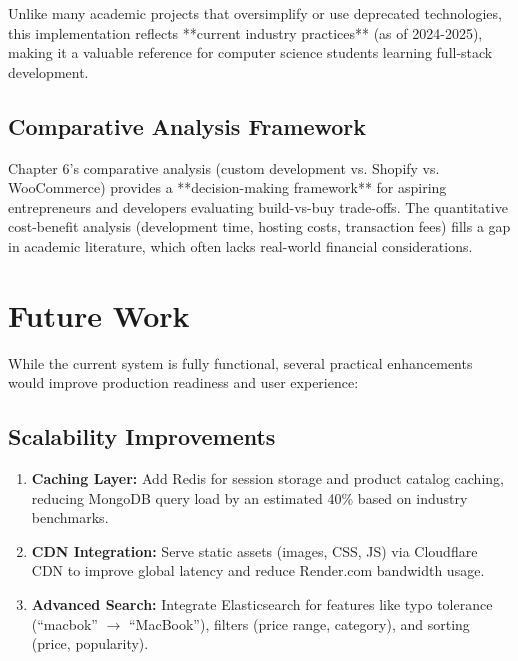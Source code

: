 \documentclass[12pt, a4paper]{report}
\begin{document}
Unlike many academic projects that oversimplify or use deprecated technologies, this implementation reflects **current industry practices** (as of 2024-2025), making it a valuable reference for computer science students learning full-stack development.

\subsection{Comparative Analysis Framework}

Chapter 6's comparative analysis (custom development vs. Shopify vs. WooCommerce) provides a **decision-making framework** for aspiring entrepreneurs and developers evaluating build-vs-buy trade-offs. The quantitative cost-benefit analysis (development time, hosting costs, transaction fees) fills a gap in academic literature, which often lacks real-world financial considerations.



\section{Future Work}

While the current system is fully functional, several practical enhancements would improve production readiness and user experience:


\subsection{Scalability Improvements}

\begin{enumerate}
    \item \textbf{Caching Layer:} Add Redis for session storage and product catalog caching, reducing MongoDB query load by an estimated 40\% based on industry benchmarks.
    
    \item \textbf{CDN Integration:} Serve static assets (images, CSS, JS) via Cloudflare CDN to improve global latency and reduce Render.com bandwidth usage.
    
    \item \textbf{Advanced Search:} Integrate Elasticsearch for features like typo tolerance (``macbok'' $\rightarrow$ ``MacBook''), filters (price range, category), and sorting (price, popularity).
\end{enumerate}
\end{document}
